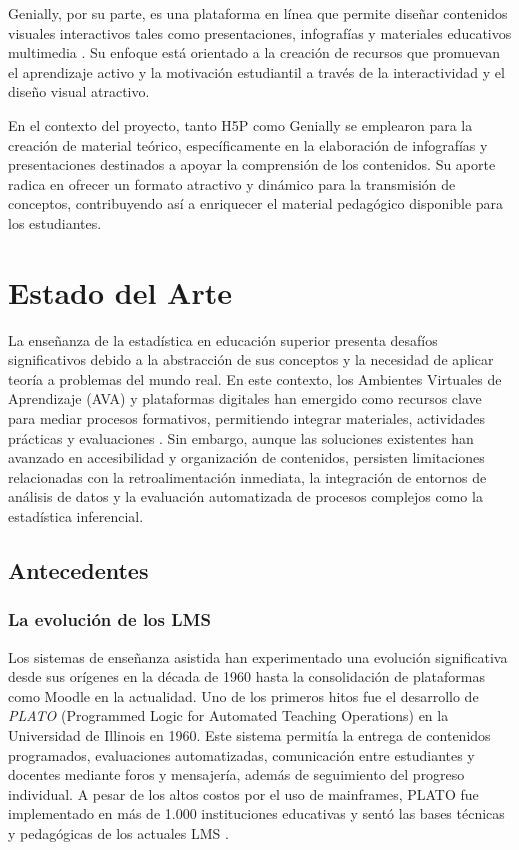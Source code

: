 \documentclass[letter,oneside,12pt,spanish]{report}
\begin{document}
Genially, por su parte, es una plataforma en línea que permite diseñar contenidos visuales interactivos tales como presentaciones, infografías y materiales educativos multimedia \parencite{genially2023}. Su enfoque está orientado a la creación de recursos que promuevan el aprendizaje activo y la motivación estudiantil a través de la interactividad y el diseño visual atractivo.

En el contexto del proyecto, tanto H5P como Genially se emplearon para la creación de material teórico, específicamente en la elaboración de infografías y presentaciones destinados a apoyar la comprensión de los contenidos. Su aporte radica en ofrecer un formato atractivo y dinámico para la transmisión de conceptos, contribuyendo así a enriquecer el material pedagógico disponible para los estudiantes.


\newpage


\chapter{Estado del Arte}

La enseñanza de la estadística en educación superior presenta desafíos significativos debido a la abstracción de sus conceptos y la necesidad de aplicar teoría a problemas del mundo real. En este contexto, los Ambientes Virtuales de Aprendizaje (AVA) y plataformas digitales han emergido como recursos clave para mediar procesos formativos, permitiendo integrar materiales, actividades prácticas y evaluaciones \parencite{AlHaddad2024}. Sin embargo, aunque las soluciones existentes han avanzado en accesibilidad y organización de contenidos, persisten limitaciones relacionadas con la retroalimentación inmediata, la integración de entornos de análisis de datos y la evaluación automatizada de procesos complejos como la estadística inferencial.

\section{Antecedentes}

\subsection{La evolución de los LMS}
Los sistemas de enseñanza asistida han experimentado una evolución significativa desde sus orígenes en la década de 1960 hasta la consolidación de plataformas como Moodle en la actualidad. Uno de los primeros hitos fue el desarrollo de \textit{PLATO} (Programmed Logic for Automated Teaching Operations) en la Universidad de Illinois en 1960. Este sistema permitía la entrega de contenidos programados, evaluaciones automatizadas, comunicación entre estudiantes y docentes mediante foros y mensajería, además de seguimiento del progreso individual. A pesar de los altos costos por el uso de mainframes, PLATO fue implementado en más de 1.000 instituciones educativas y sentó las bases técnicas y pedagógicas de los actuales LMS \parencite{Woolley2016}.
\end{document}
